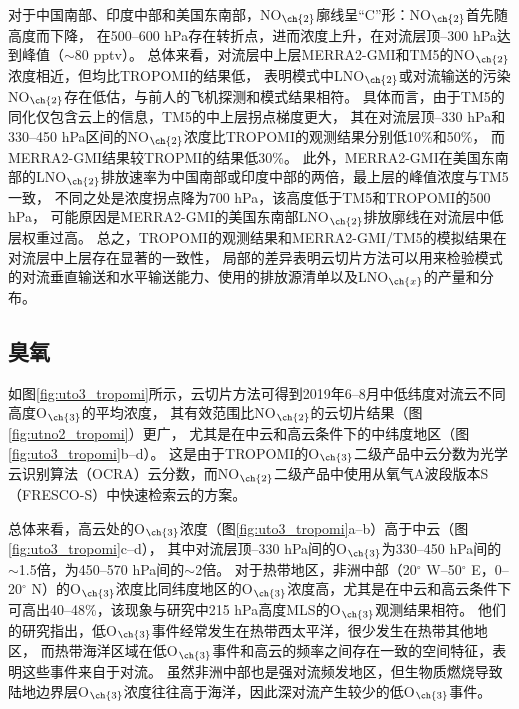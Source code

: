 对于中国南部、印度中部和美国东南部，NO$_{\ch{2}}$廓线呈“C”形：NO$_{\ch{2}}$首先随高度而下降，
在500--600 hPa存在转折点，进而浓度上升，在对流层顶--300 hPa达到峰值（$\sim$80 pptv）。
总体来看，对流层中上层MERRA2-GMI和TM5的NO$_{\ch{2}}$浓度相近，但均比TROPOMI的结果低，
表明模式中LNO$_{\ch{2}}$或对流输送的污染NO$_{\ch{2}}$存在低估，与前人的飞机探测和模式结果相符\citep{Laughner.2019a}。
具体而言，由于TM5的同化仅包含云上的信息，TM5的中上层拐点梯度更大，
其在对流层顶--330 hPa和330--450 hPa区间的NO$_{\ch{2}}$浓度比TROPOMI的观测结果分别低10\%和50\%，
而MERRA2-GMI结果较TROPMI的结果低30\%。
此外，MERRA2-GMI在美国东南部的LNO$_{\ch{2}}$排放速率为中国南部或印度中部的两倍，最上层的峰值浓度与TM5一致，
不同之处是浓度拐点降为700 hPa，该高度低于TM5和TROPOMI的500 hPa，
可能原因是MERRA2-GMI的美国东南部LNO$_{\ch{2}}$排放廓线在对流层中低层权重过高。
总之，TROPOMI的观测结果和MERRA2-GMI/TM5的模拟结果在对流层中上层存在显著的一致性，
局部的差异表明云切片方法可以用来检验模式的对流垂直输送和水平输送能力、使用的排放源清单以及LNO$_{\ch{x}}$的产量和分布。


\subsection{臭氧} \label{sec:o3_profile}

如图\ref{fig:uto3_tropomi}所示，云切片方法可得到2019年6--8月中低纬度对流云不同高度O$_{\ch{3}}$的平均浓度，
其有效范围比NO$_{\ch{2}}$的云切片结果（图\ref{fig:utno2_tropomi}）更广，
尤其是在中云和高云条件下的中纬度地区（图\ref{fig:uto3_tropomi}b--d）。
这是由于TROPOMI的O$_{\ch{3}}$二级产品中云分数为光学云识别算法（OCRA）云分数，而NO$_{\ch{2}}$二级产品中使用从氧气A波段版本S（FRESCO-S）中快速检索云的方案。

总体来看，高云处的O$_{\ch{3}}$浓度（图\ref{fig:uto3_tropomi}a--b）高于中云（图\ref{fig:uto3_tropomi}c--d），
其中对流层顶--330 hPa间的O$_{\ch{3}}$为330--450 hPa间的$\sim$1.5倍，为450--570 hPa间的$\sim$2倍。
对于热带地区，非洲中部（20$^{\circ}$ W--50$^{\circ}$ E，0--20$^{\circ}$ N）的O$_{\ch{3}}$浓度比同纬度地区的O$_{\ch{3}}$浓度高，尤其是在中云和高云条件下可高出40--48\%，该现象与\citet{Cooper.2013}研究中215 hPa高度MLS的O$_{\ch{3}}$观测结果相符。
他们的研究指出，低O$_{\ch{3}}$事件经常发生在热带西太平洋，很少发生在热带其他地区，
而热带海洋区域在低O$_{\ch{3}}$事件和高云的频率之间存在一致的空间特征，表明这些事件来自于对流。
虽然非洲中部也是强对流频发地区，但生物质燃烧导致陆地边界层O$_{\ch{3}}$浓度往往高于海洋\citep{Thompson.2001,Anderson.2016}，因此深对流产生较少的低O$_{\ch{3}}$事件。

